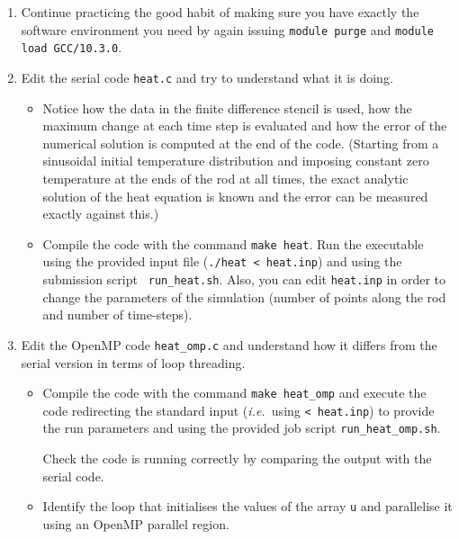 \documentclass[a4paper, 12pt]{article}
\def \cc   {\tt }               %
\def \ie   {{\em i.e.\ }}
\begin{document}
\begin{enumerate}
  
  \item Continue practicing the good habit of making sure you have exactly
    the software environment you need by again issuing {\cc module purge} and
    {\cc module load GCC/10.3.0}. 

  \item Edit the serial code {\cc heat.c} and try to understand what it
    is doing.

    \begin{itemize}
      \item Notice how the data in the finite difference stencil is
        used, how the maximum change at each time step is evaluated
        and how the error of the numerical solution is computed at the
        end of the code.  (Starting from a sinusoidal initial
        temperature distribution and imposing constant zero
        temperature at the ends of the rod at all times, the exact
        analytic solution of the heat equation is known and the error
        can be measured exactly against this.)

      \item Compile the code with the command {\cc make heat}.  Run
        the executable using the provided input file ({\cc ./heat <
          heat.inp}) and using the submission script {\cc
          run\_heat.sh}.  Also, you can edit {\cc heat.inp} in order to
        change the parameters of the simulation (number of points
        along the rod and number of time-steps).
    \end{itemize}

  \item Edit the OpenMP code {\cc heat\_omp.c} and understand how it differs from the
    serial version in terms of loop threading.

    \begin{itemize}
      \item Compile the code with the command {\cc make heat\_omp} and
        execute the code redirecting the standard input (\ie using
        {\cc < heat.inp}) to provide the run parameters and using the
        provided job script {\cc run\_heat\_omp.sh}.

        Check the code is running correctly by comparing the output with the serial code.

      \item Identify the loop that initialises the values of the array
        {\cc u} and parallelise it using an OpenMP parallel region.


\end{itemize}
\end{enumerate}
\end{document}
